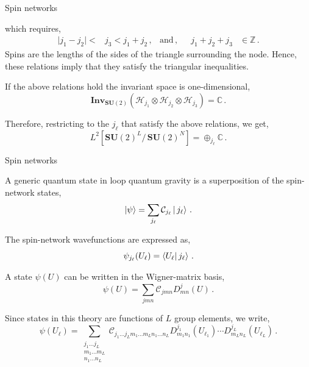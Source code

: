 \documentclass{beamer}
\begin{document}
\begin{frame}{Spin networks}
\begin{list}{\maltese}{\leftmargin=1em \itemindent=0em}
\begin{equation}
        \end{equation}
        which requires,
        \begin{align}
            \lvert j_1-j_2\rvert<&j_3<j_1+j_2\,,&\text{and}\,,& &j_1+j_2+j_3&\in\mathbb{Z}\,. 
        \end{align}
        Spins are the lengths of the sides of the triangle surrounding the node. Hence, these relations imply that they satisfy the triangular inequalities.
        \item<3-> If the above relations hold the invariant space is one-dimensional,
        \begin{equation}
            \mathbf{Inv}_{\mathbf{SU}(2)}(\mathcal{H}_{j_1}\otimes\mathcal{H}_{j_2}\otimes\mathcal{H}_{j_3})=\mathbb{C}\,.
        \end{equation}
        \item<4-> Therefore, restricting to the $j_\ell$ that satisfy the above relations, we get,
        \begin{equation}
            L^2[{\mathbf{SU}(2)}^L/\,{\mathbf{SU}(2)}^N]=\oplus_{j_\ell}\mathbb{C}\,.
        \end{equation}
    \end{list}
\end{frame}

\begin{frame}{Spin networks}
    \begin{list}{\maltese}{\leftmargin=1em \itemindent=0em}
        \item<1-> A generic quantum state in loop quantum gravity is a superposition of the spin-network states,
        \begin{equation}
            \ket{\psi}=\sum_{j_\ell}\mathcal{C}_{j_\ell}\ket{\,{j_\ell}}\,.
        \end{equation}
        \item<2-> The spin-network wavefunctions are expressed as,
        \begin{equation}
            \psi_{j_\ell}(U_\ell)=\braket{U_\ell}{\,j_\ell}\,.
        \end{equation}
        \item<3-> A state $\psi(U)$ can be written in the Wigner-matrix basis,
        \begin{equation}
            \psi(U)=\sum_{jmn}\mathcal{C}_{jmn}D^j_{mn}(U)\,.
        \end{equation}
        \item<4-> Since states in this theory are functions of $L$ group elements, we write,
        \begin{equation}
            \psi(U_\ell)=\sum_{\substack{j_1\dots j_L \\ m_1\dots m_L \\ n_1\dots n_L}}\mathcal{C}_{j_1\dots j_L m_1\dots m_L n_1\dots n_L} D^{j_1}_{m_1n_1}(U_{\ell_1})\cdots D^{j_L}_{m_Ln_L}(U_{\ell_L})\,.
        \end{equation} 
    \end{list}
\end{frame}
\end{document}
